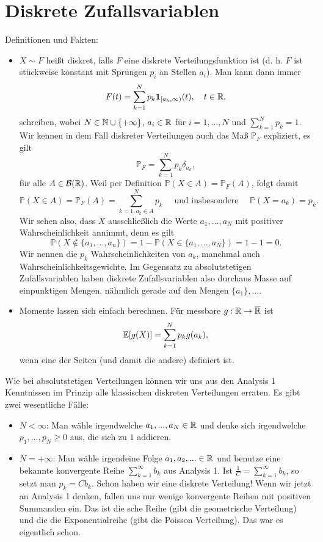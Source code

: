 \documentclass[11pt, a4paper]{book}
\begin{document}
\section{Diskrete Zufallsvariablen}
Definitionen und Fakten:
\begin{itemize}
	\item $X\sim F$ hei\ss t diskret, falls $F$ eine diskrete Verteilungsfunktion ist (d. h. $F$ ist st\"uckweise konstant mit Spr\"ungen $p_i$ an Stellen $a_i$). Man kann dann immer $$F(t)=\sum_{k=1}^N p_k \mathbf 1_{[a_k,\infty)}(t),\quad t\in\mathbb{R},$$ schreiben, wobei $N\in \mathbb{N}\cup \{+\infty\}$, $a_i\in\mathbb{R}$ f\"ur $i=1,...,N$ und $\sum_{k=1}^N p_k=1$. Wir kennen in dem Fall diskreter Verteilungen auch das Ma\ss{} $\mathbb P_F$ expliziert, es gilt
	$$\mathbb P_F=\sum_{k=1}^N p_k \delta_{a_k},$$ f\"ur alle $A\in \mathcal B(\mathbb{R})$. Weil per Definition $\mathbb P(X\in A)=\mathbb P_F(A)$, folgt damit
	 $$\mathbb P(X\in A)=\mathbb P_F(A)=\sum_{k=1, a_k\in A}^N p_k\quad \text{ und insbesondere }\quad \mathbb P(X=a_k)=p_k.$$
	Wir sehen also, dass $X$ ausschlie\ss lich die Werte $a_1,...,a_N$ mit positiver Wahrscheinlichkeit annimmt, denn es gilt
	$$\mathbb P(X\notin \{a_1,...,a_n\})=1-\mathbb P(X\in \{a_1,...,a_N\})=1-1=0.$$	
	Wir nennen die $p_k$ Wahrscheinlichkeiten von $a_k$, manchmal auch Wahrscheinlichkeitsgewichte. Im Gegensatz zu absolutstetigen Zufallsvariablen haben diskrete Zufallsvariablen also durchaus Masse auf einpunktigen Mengen, n\"ahmlich gerade auf den Mengen $\{a_1\}, ...$.
	\item Momente lassen sich einfach berechnen. F\"ur messbare $g:\mathbb{R}\to \overline {\mathbb{R}}$ ist
	\begin{align*}
		\mathbb{E}[g(X)]=\sum_{k=1}^N p_k g(a_k),
	\end{align*}
	wenn eine der Seiten (und damit die andere) definiert ist.
\end{itemize}
Wie bei absolutstetigen Verteilungen k\"onnen wir uns aus den Analysis 1 Kenntnissen im Prinzip alle klassischen diskreten Verteilungen erraten. Es gibt zwei wesentliche F\"alle:
\begin{itemize}
	\item $N<\infty$: Man w\"ahle irgendwelche $a_1,...,a_N\in\mathbb{R}$ und denke sich irgendwelche $p_1,...,p_N \geq 0$ aus, die sich zu $1$ addieren.
	\item $N=+\infty$: Man w\"ahle irgendeine Folge $a_1,a_2,...\in \mathbb{R}$ und benutze eine bekannte konvergente Reihe $\sum_{k=1}^\infty b_k$ aus Analysis 1. Ist $\frac 1 C=\sum_{k=1}^\infty b_k$, so setzt man $p_k=Cb_k$. Schon haben wir eine diskrete Verteilung! Wenn wir jetzt an Analysis 1 denken, fallen uns nur wenige konvergente Reihen mit positiven Summanden ein. Das ist die 
	sche Reihe (gibt die geometrische Verteilung) und die die Exponentialreihe (gibt die Poisson Verteilung). Das war es eigentlich schon.
\end{itemize}
\end{document}
